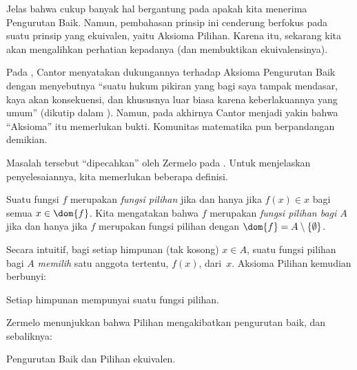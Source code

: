 \documentclass[../../../include/open-logic-section]{subfiles}
\begin{document}

Jelas bahwa cukup banyak hal bergantung pada apakah kita menerima Pengurutan
Baik. Namun, pembahasan prinsip ini cenderung berfokus pada suatu prinsip yang
ekuivalen, yaitu Aksioma Pilihan. Karena itu, sekarang kita akan mengalihkan
perhatian kepadanya (dan membuktikan ekuivalensinya).

Pada \citeyear{Cantor1883}, Cantor menyatakan dukungannya terhadap Aksioma
Pengurutan Baik dengan menyebutnya ``suatu hukum pikiran yang bagi saya
tampak mendasar, kaya akan konsekuensi, dan khususnya luar biasa karena
keberlakuannya yang umum'' (dikutip dalam \citeauthor{Potter2004}
\citeyear[hlm.~243]{Potter2004}). Namun, pada akhirnya Cantor menjadi yakin
bahwa ``Aksioma'' itu memerlukan bukti. Komunitas matematika pun
berpandangan demikian.

Masalah tersebut ``dipecahkan'' oleh Zermelo pada
\citeyear{Zermelo1904}. Untuk menjelaskan penyelesaiannya, kita memerlukan
beberapa definisi.

\begin{defn}
Suatu fungsi $f$ merupakan \emph{fungsi pilihan} jika dan hanya jika
$f(x) \in x$ bagi semua $x \in \dom{f}$. Kita mengatakan bahwa $f$
merupakan \emph{fungsi pilihan bagi $A$} jika dan hanya jika $f$ merupakan
fungsi pilihan dengan $\dom{f} = A \setminus \{\emptyset\}$.
\end{defn}

Secara intuitif, bagi setiap himpunan (tak kosong) $x \in A$, suatu fungsi
pilihan bagi $A$ \emph{memilih} satu anggota tertentu, $f(x)$, dari~$x$.
Aksioma Pilihan kemudian berbunyi:

\begin{axiom}[Pilihan]
	Setiap himpunan mempunyai suatu fungsi pilihan.
\end{axiom}

Zermelo menunjukkan bahwa Pilihan mengakibatkan pengurutan baik, dan
sebaliknya:

\begin{thm}[dalam $\ZF$]
Pengurutan Baik dan Pilihan ekuivalen.
\end{thm}
\end{document}
